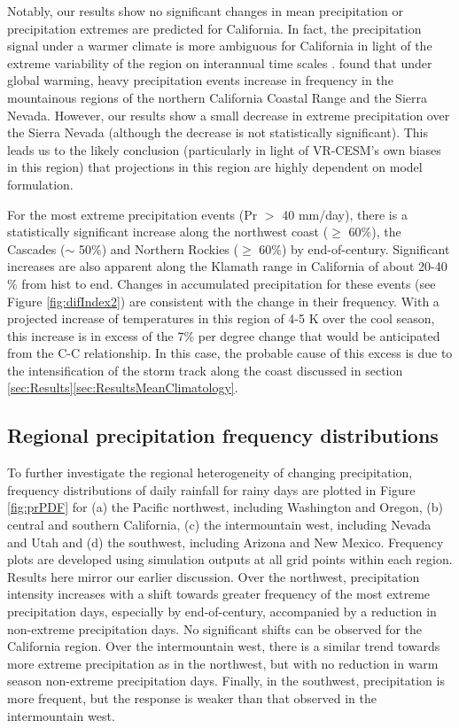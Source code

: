 \documentclass{ametsoc}
\begin{document}
Notably, our results show no significant changes in mean precipitation or precipitation extremes are predicted for California.  In fact, the precipitation signal under a warmer climate is more ambiguous for California \citep{neelin2013california} in light of the extreme variability of the region on interannual time scales \citep{dettinger2011climate}. \cite{kim2005projection} found that under global warming, heavy precipitation events increase in frequency in the mountainous regions of the northern California Coastal Range and the Sierra Nevada. However, our results show a small decrease in extreme precipitation over the Sierra Nevada (although the decrease is not statistically significant).  This leads us to the likely conclusion (particularly in light of VR-CESM's own biases in this region) that projections in this region are highly dependent on model formulation.


For the most extreme precipitation events (Pr $>$ 40 mm/day), there is a statistically significant increase along the northwest coast ($\geq$ 60$\%$), the Cascades ($\sim$ 50$\%$) and Northern Rockies ($\geq$ 60$\%$) by end-of-century. Significant increases are also apparent along the Klamath range in California of about 20-40$\%$ from \textsf{hist} to \textsf{end}. Changes in accumulated precipitation for these events (see Figure \ref{fig:difIndex2}) are consistent with the change in their frequency.  With a projected increase of temperatures in this region of 4-5 K over the cool season, this increase is in excess of the 7\% per degree change that would be anticipated from the C-C relationship.  In this case, the probable cause of this excess is due to the intensification of the storm track along the coast discussed in section \ref{sec:Results}\ref{sec:ResultsMeanClimatology}.


\subsection{Regional precipitation frequency distributions}

To further investigate the regional heterogeneity of changing precipitation, frequency distributions of daily rainfall for rainy days are plotted in Figure \ref{fig:prPDF} for (a) the Pacific northwest, including Washington and Oregon, (b) central and southern California, (c) the intermountain west, including Nevada and Utah and (d) the southwest, including Arizona and New Mexico.  Frequency plots are developed using simulation outputs at all grid points within each region. Results here mirror our earlier discussion.  Over the northwest, precipitation intensity increases with a shift towards greater frequency of the most extreme precipitation days, especially by end-of-century, accompanied by a reduction in non-extreme precipitation days. No significant shifts can be observed for the California region. Over the intermountain west, there is a similar trend towards more extreme precipitation as in the northwest, but with no reduction in warm season non-extreme precipitation days. Finally, in the southwest, precipitation is more frequent, but the response is weaker than that observed in the intermountain west.
\end{document}
